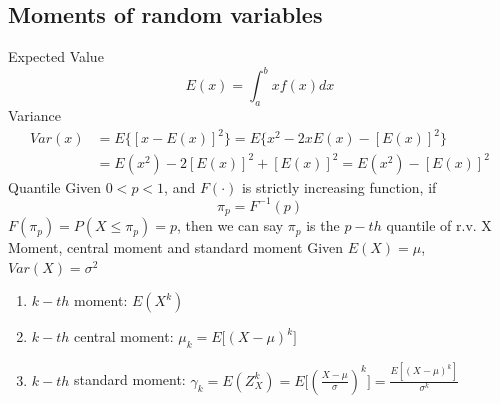 \documentclass[12pt]{article}
\begin{document}
        \subsection*{Moments of random variables}
        Expected Value
        \begin{equation}
            E(x)=\int_{a}^bxf(x)dx
        \end{equation}
        Variance
        \begin{equation}
            \begin{aligned}
                Var(x)&=E\{[x-E(x)]^2\}=E\{x^2-2xE(x)-[E(x)]^2\}\\
                      &=E(x^2)-2[E(x)]^2+[E(x)]^2 = E(x^2)-[E(x)]^2
            \end{aligned}
        \end{equation}
        Quantile
        \newline
        \newline
        Given $0<p<1$, and $F(\cdot)$ is strictly increasing function, if
        \begin{equation}
            \pi_p=F^{-1}(p)
        \end{equation}
        $F(\pi_p) = P(X\leq \pi_p)=p$, then we can say $\pi_p$ is the $p-th$ quantile of r.v. X
        \newpage
        \hspace*{-6.2mm}Moment, central moment and standard moment
        \newline
        \newline
        Given $E(X)=\mu$, $Var(X)=\sigma^2$
        \begin{enumerate}
            \item $k-th$ moment: $E(X^k)$
            \item $k-th$ central moment: $\mu_k=E\big[(X-\mu)^k\big]$
            \item $k-th$ standard moment: $\gamma_k=E(Z_X^k)=E\bigg[(\frac{X-\mu}{\sigma})^k\bigg]=\frac{E[(X-\mu)^k]}{\sigma^k}$
        \end{enumerate}
\end{document}
